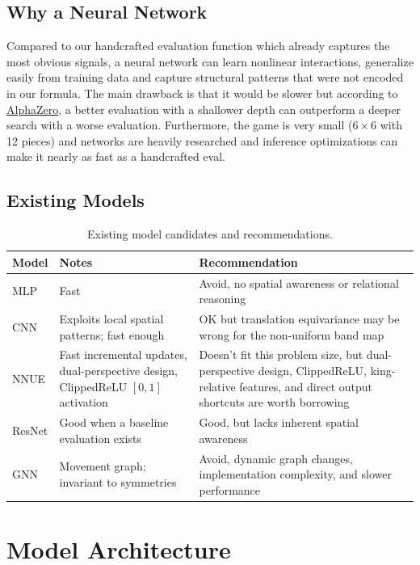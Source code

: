 \documentclass[11pt,a4paper]{article}
\begin{document}
\subsection{Why a Neural Network}
Compared to our handcrafted evaluation function which already captures the most obvious signals, a neural network can learn nonlinear interactions, generalize easily from training data and capture structural patterns that were not encoded in our formula.
The main drawback is that it would be slower but according to \href{https://arxiv.org/abs/1712.01815}{AlphaZero}, a better evaluation with a shallower depth can outperform a deeper search with a worse evaluation. Furthermore, the game is very small ($6\times6$ with 12 pieces) and networks are heavily researched and inference optimizations can make it nearly as fast as a handcrafted eval.

\newpage
\subsection{Existing Models}
\begin{table}[htbp]
  \centering
  \begin{tabular}{L{0.12\textwidth} L{0.53\textwidth} L{0.27\textwidth}}
    \toprule
    Model & Notes & Recommendation \\
    \midrule
    MLP & Fast & Avoid, no spatial awareness or relational reasoning \\
    CNN & Exploits local spatial patterns; fast enough & OK but translation equivariance may be wrong for the non-uniform band map \\
    NNUE & Fast incremental updates, dual-perspective design, ClippedReLU $[0,1]$ activation & Doesn't fit this problem size, but dual-perspective design, ClippedReLU, king-relative features, and direct output shortcuts are worth borrowing \\
    ResNet & Good when a baseline evaluation exists & Good, but lacks inherent spatial awareness \\
    GNN & Movement graph; invariant to symmetries & Avoid, dynamic graph changes, implementation complexity, and slower performance \\
    \bottomrule
  \end{tabular}
    \caption{Existing model candidates and recommendations.}
    \label{tab:existing-models}
\end{table}

\clearpage
\section{Model Architecture}
\end{document}
